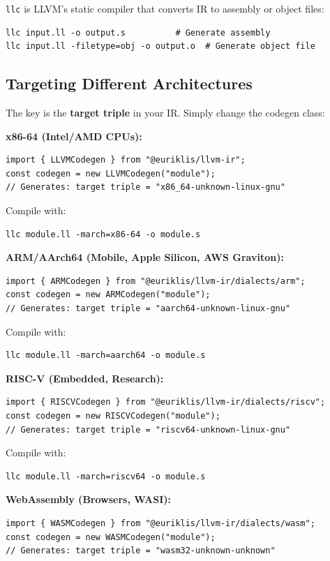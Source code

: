 \documentclass[11pt]{article}
\begin{document}
\texttt{llc} is LLVM's static compiler that converts IR to assembly or object files:

\begin{lstlisting}[style=ts]
llc input.ll -o output.s          # Generate assembly
llc input.ll -filetype=obj -o output.o  # Generate object file
\end{lstlisting}

\subsection{Targeting Different Architectures}

The key is the \textbf{target triple} in your IR. Simply change the codegen class:

\textbf{x86-64 (Intel/AMD CPUs):}
\begin{lstlisting}[style=ts]
import { LLVMCodegen } from "@euriklis/llvm-ir";
const codegen = new LLVMCodegen("module");
// Generates: target triple = "x86_64-unknown-linux-gnu"
\end{lstlisting}

Compile with:
\begin{lstlisting}[style=ts]
llc module.ll -march=x86-64 -o module.s
\end{lstlisting}

\textbf{ARM/AArch64 (Mobile, Apple Silicon, AWS Graviton):}
\begin{lstlisting}[style=ts]
import { ARMCodegen } from "@euriklis/llvm-ir/dialects/arm";
const codegen = new ARMCodegen("module");
// Generates: target triple = "aarch64-unknown-linux-gnu"
\end{lstlisting}

Compile with:
\begin{lstlisting}[style=ts]
llc module.ll -march=aarch64 -o module.s
\end{lstlisting}

\textbf{RISC-V (Embedded, Research):}
\begin{lstlisting}[style=ts]
import { RISCVCodegen } from "@euriklis/llvm-ir/dialects/riscv";
const codegen = new RISCVCodegen("module");
// Generates: target triple = "riscv64-unknown-linux-gnu"
\end{lstlisting}

Compile with:
\begin{lstlisting}[style=ts]
llc module.ll -march=riscv64 -o module.s
\end{lstlisting}

\textbf{WebAssembly (Browsers, WASI):}
\begin{lstlisting}[style=ts]
import { WASMCodegen } from "@euriklis/llvm-ir/dialects/wasm";
const codegen = new WASMCodegen("module");
// Generates: target triple = "wasm32-unknown-unknown"
\end{lstlisting}
\end{document}
